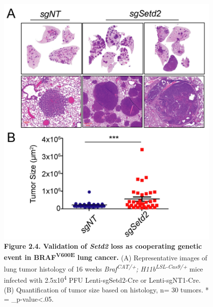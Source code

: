 \begin{figure}
\hypertarget{fig:07}{%
\centering
\includegraphics[width=1\textwidth,height=\textheight]{images/tuba4.png}
\caption{\textbf{Figure 2.4. Validation of \emph{Setd2} loss as cooperating genetic event in BRAF\textsuperscript{V600E} lung cancer.} (A) Representative images of lung tumor histology of 16 weeks \emph{Braf\textsuperscript{CAT/+}; H11b\textsuperscript{LSL-Cas9/+}} mice infected with 2.5x10\textsuperscript{4} PFU Lenti-sgSetd2-Cre or Lenti-sgNT1-Cre. (B) Quantification of tumor size based on histology, n= 30 tumors. * = \_p-value\textless.05.}\label{fig:07}
}
\end{figure}

